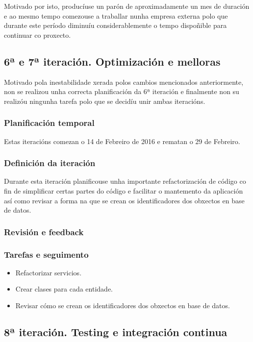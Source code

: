   Motivado por isto, producíuse un parón de aproximadamente un mes de duración 
e ao mesmo tempo comezouse a traballar nunha empresa externa polo que durante 
este período diminuíu considerablemente o tempo dispoñible para continuar co 
proxecto.

    \subsection{6ª e 7ª iteración. Optimización e melloras}
    Motivado pola inestabilidade xerada polos cambios mencionados anteriormente,
non se realizou unha correcta planificación da 6ª iteración e finalmente non su 
realizóu ningunha tarefa polo que se decidíu unir ambas iteracións.

      \subsubsection{Planificación temporal}
      Estas iteracións comezan o 14 de Febreiro de 2016 e rematan o 29 de 
Febreiro.

      \subsubsection{Definición da iteración}
      Durante esta iteración planificouse unha importante refactorización de 
código co fin de simplificar certas partes do código e facilitar o mantemento 
da aplicación así como revisar a forma na que se crean os identificadores dos 
obxectos en base de datos.

      \subsubsection{Revisión e feedback}


      \subsubsection{Tarefas e seguimento}

        \begin{itemize}
         \item Refactorizar servicios.
         \item Crear clases para cada entidade.
         \item Revisar cómo se crean os identificadores dos obxectos en base de 
datos.
        \end{itemize}

    \subsection{8ª iteración. Testing e integración continua}

